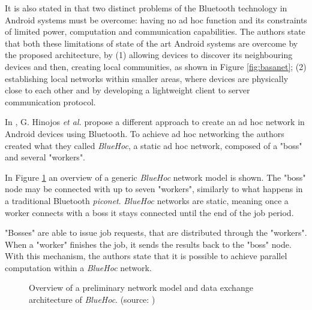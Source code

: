 It is also stated in \cite{basa} that two distinct problems of the Bluetooth technology in Android systems must be overcome: having no ad hoc function and its constraints of limited power, computation and communication capabilities. The authors state that both these limitations of state of the art Android systems are overcome by the proposed architecture, by (1) allowing devices to discover its neighbouring devices and then, creating local communities, as shown in Figure \ref{fig:basanet}; (2) establishing local networks within smaller areas, where devices are physically close to each other and by developing a lightweight client to server communication protocol.

In \cite{bluehoc}, G. Hinojos \textit{et al.} propose a different approach to create an ad hoc network in Android devices using Bluetooth. To achieve ad hoc networking the authors created what they called \textit{BlueHoc}, a static ad hoc network, composed of a "boss" and several "workers".

In Figure \ref{fig:bluehocnet} an overview of a generic \textit{BlueHoc} network model is shown. The "boss" node may be connected with up to seven "workers", similarly to what happens in a traditional Bluetooth \textit{piconet}. \textit{BlueHoc} networks are static, meaning once a worker connects with a boss it stays connected until the end of the job period.

"Bosses" are able to issue job requests, that are distributed through the "workers". When a "worker" finishes the job, it sends the results back to the "boss" node. With this mechanism, the authors state that it is possible to achieve parallel computation within a \textit{BlueHoc} network.

\begin{figure}[ht]
	\noindent{}
	\caption{\label{fig:bluehocnet} Overview of a preliminary network model and data exchange architecture of \textit{BlueHoc}. (source: \cite{bluehoc})}
\end{figure}

